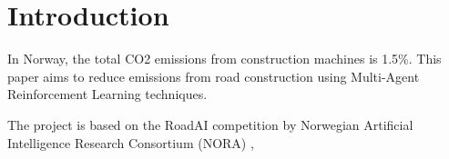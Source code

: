 \documentclass[conference]{IEEEtran}
\begin{document}
\section{Introduction}
In Norway, the total CO2 emissions from construction machines is 1.5\%. \cite{noraRoadAIReducing}
This paper aims to reduce emissions from road construction using Multi-Agent Reinforcement Learning
techniques.

The project is based on the RoadAI competition by Norwegian Artificial Intelligence Research
Consortium (NORA) \cite{noraRoadAIReducing}, 


{}

\end{document}

